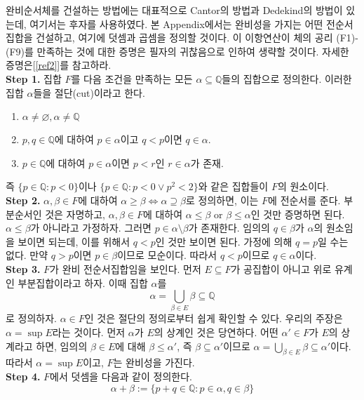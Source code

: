 \documentclass[11pt]{book}
\numberwithin{equation}{chapter}
\def\QQ{\mathbb{Q}}
\theoremstyle{definition}
\begin{document}
완비순서체를 건설하는 방법에는 대표적으로 Cantor의 방법과 Dedekind의 방법이 있는데, 여기서는 후자를 사용하였다. 본 Appendix에서는 완비성을 가지는 어떤 전순서집합을 건설하고, 여기에 덧셈과 곱셈을 정의할 것이다. 이 이항연산이 체의 공리 (F1)-(F9)를 만족하는 것에 대한 증명은 필자의 귀찮음으로 인하여 생략할 것이다. 자세한 증명은[\ref{ref2}]를 참고하라.\\
\textbf{Step 1.} 집합 \(F\)를 다음 조건을 만족하는 모든 \(\alpha \subseteq \QQ\)들의 집합으로 정의한다. 이러한 집합 \(\alpha\)들을 절단(cut)이라고 한다.
    \begin{enumerate} [label=(\alph*), leftmargin=2\parindent]
        \item \(\alpha \ne \varnothing, \alpha \ne \QQ\)
        \item \(p, q \in \QQ\)에 대하여 \(p \in \alpha\)이고 \(q < p\)이면 \(q \in \alpha\).
        \item \(p\in \QQ\)에 대하여 \(p \in \alpha\)이면 \(p < r\)인 \(r \in \alpha\)가 존재.
    \end{enumerate}
즉 \(\{p \in \QQ: p < 0\}\)이나 \(\{p \in \QQ : p < 0 \lor p^2 < 2\}\)와 같은 집합들이 \(F\)의 원소이다.\\
\textbf{Step 2.} \(\alpha, \beta \in F\)에 대하여 \(\alpha \ge \beta \iff \alpha \supseteq \beta\)로 정의하면, 이는 \(F\)에 전순서를 준다. 부분순서인 것은 자명하고, \(\alpha, \beta \in F\)에 대하여 \(\alpha \le \beta\) or \(\beta \le \alpha\)인 것만 증명하면 된다. \(\alpha \le \beta\)가 아니라고 가정하자. 그러면 \(p \in \alpha \setminus \beta\)가 존재한다. 임의의 \(q \in \beta\)가 \(\alpha\)의 원소임을 보이면 되는데, 이를 위해서 \(q < p\)인 것만 보이면 된다. 가정에 의해 \(q = p\)일 수는 없다. 만약 \(q > p\)이면 \(p \in \beta\)이므로 모순이다. 따라서 \(q < p\)이므로 \(q \in \alpha\)이다.\\
\textbf{Step 3.} \(F\)가 완비 전순서집합임을 보인다. 먼저 \(E \subseteq F\)가 공집합이 아니고 위로 유계인 부분집합이라고 하자. 이때 집합 \(\alpha\)를
\[
\alpha = \bigcup_{\beta \in E} \beta \subseteq \QQ
\]
로 정의하자. \(\alpha \in F\)인 것은 절단의 정의로부터 쉽게 확인할 수 있다. 우리의 주장은 \(\alpha = \sup E\)라는 것이다. 먼저 \(\alpha\)가 \(E\)의 상계인 것은 당연하다. 어떤 \(\alpha' \in F\)가 \(E\)의 상계라고 하면, 임의의 \(\beta \in E\)에 대해 \(\beta \le \alpha'\), 즉 \(\beta \subseteq \alpha'\)이므로 \(\alpha = \bigcup_{\beta \in E}\beta \subseteq \alpha'\)이다. 따라서 \(\alpha = \sup E\)이고, \(F\)는 완비성을 가진다.\\
\textbf{Step 4.} \(F\)에서 덧셈을 다음과 같이 정의한다.
\[
\alpha + \beta := \{p + q \in \QQ : p \in \alpha, q \in \beta\}    
\]
\end{document}

